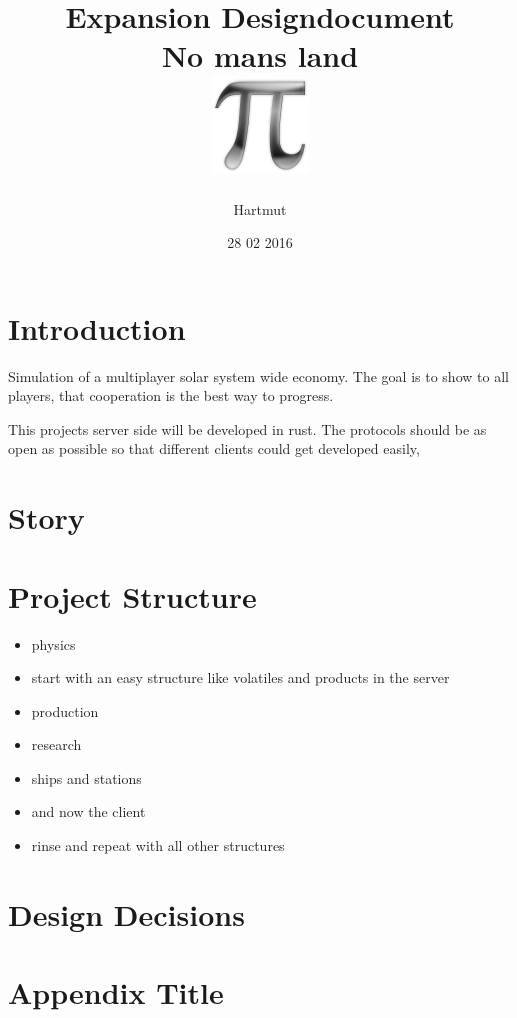 \documentclass[a4paper,10pt]{book}
\title{
	{Expansion Designdocument}\\
	{\large No mans land}\\
	{\includegraphics{pi-black.png}}
}
\author{Hartmut}
\date{28 02 2016}
\begin{document}
\maketitle

\tableofcontents
\chapter{Introduction}
Simulation of a multiplayer solar system wide economy.
The goal is to show to all players, that cooperation is the best way to progress.

This projects server side will be developed in rust. The protocols should be as open as possible so that different clients could get developed easily,

\chapter{Story}


\chapter{Project Structure}
\begin{itemize}
 \item physics
 \item start with an easy structure like volatiles and products in the server
 \item production
 \item research
 \item ships and stations
 \item and now the client
 \item rinse and repeat with all other structures
\end{itemize}


\chapter{Design Decisions}


\appendix
\chapter{Appendix Title}

\end{document}
